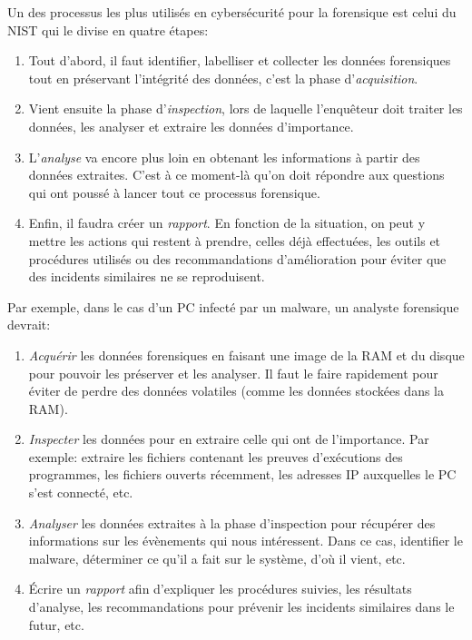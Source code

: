 Un des processus les plus utilisés en cybersécurité pour la forensique est celui du NIST qui le divise en quatre étapes: \cite{5}

\begin{enumerate}
    \item Tout d'abord, il faut identifier, labelliser et collecter les données forensiques tout en préservant l'intégrité des données, c'est la phase d'\textit{acquisition}.
    \item Vient ensuite la phase d'\textit{inspection}, lors de laquelle l'enquêteur doit traiter les données, les analyser et extraire les données d'importance.
    \item L'\textit{analyse} va encore plus loin en obtenant les informations à partir des données extraites. C'est à ce moment-là qu'on doit répondre aux questions qui ont poussé à lancer tout ce processus forensique.
    \item Enfin, il faudra créer un \textit{rapport}. En fonction de la situation, on peut y mettre les actions qui restent à prendre, celles déjà effectuées, les outils et procédures utilisés ou des recommandations d'amélioration pour éviter que des incidents similaires ne se reproduisent.
\end{enumerate}

\begin{example}
    \hspace{0.45cm} Par exemple, dans le cas d'un PC infecté par un malware, un analyste forensique devrait:
    \begin{enumerate}
        \item \textit{Acquérir} les données forensiques en faisant une image de la RAM et du disque pour pouvoir les préserver et les analyser. Il faut le faire rapidement pour éviter de perdre des données volatiles (comme les données stockées dans la RAM).
        \item \textit{Inspecter} les données pour en extraire celle qui ont de l'importance. Par exemple: extraire les fichiers contenant les preuves d'exécutions des programmes, les fichiers ouverts récemment, les adresses IP auxquelles le PC s'est connecté, etc.
        \item \textit{Analyser} les données extraites à la phase d'inspection pour récupérer des informations sur les évènements qui nous intéressent. Dans ce cas, identifier le malware, déterminer ce qu'il a fait sur le système, d'où il vient, etc.
        \item Écrire un \textit{rapport} afin d'expliquer les procédures suivies, les résultats d'analyse, les recommandations pour prévenir les incidents similaires dans le futur, etc.
    \end{enumerate}
\end{example}

